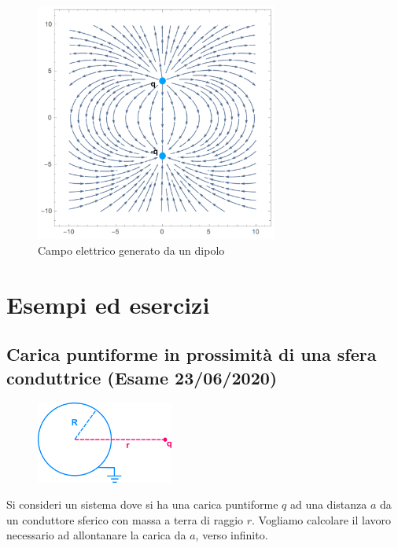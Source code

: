  
\begin{figure}[!ht]
\vspace{0.1in}
\includegraphics[width = 8cm]{images/dipol1}	
\centering
\caption{Campo elettrico generato da un dipolo}
\end{figure}

\newpage

\section{Esempi ed esercizi}

\subsection{Carica puntiforme in prossimit\`a di una sfera conduttrice (Esame 23/06/2020)}

\begin{figure} %
    \centering
    \includegraphics[width=0.4\textwidth]{images/spherecharge} %
\end{figure}
Si consideri un sistema dove si ha una carica puntiforme $q$ ad una distanza $a$ da un conduttore sferico con massa a terra di raggio $r$. Vogliamo calcolare il lavoro necessario ad allontanare la carica da $a$, verso infinito.


